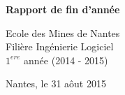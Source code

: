 \documentclass[twoside, 12pt]{report}
\begin{document}
\listoffigures

\clearpage
  \begin{sffamily}
		\begin{center}
			\vfill
				{ \huge \bfseries Rapport de fin d'année }
			\vfill
			\begin{minipage}{0.8\textwidth}
				\begin{center} \large
					Ecole des Mines de Nantes\\
					Filière Ingénierie Logiciel\\
					$1^{ere}$ année (2014 - 2015)\\
				\end{center}
			\end{minipage}
			\vfill
			{\large Nantes, le 31 aôut 2015}
		\end{center}
	\end{sffamily}
\end{document}
